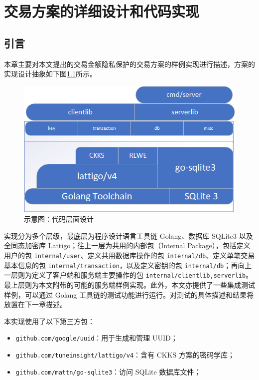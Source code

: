 \chapter{交易方案的详细设计和代码实现}

\section{引言}

本章主要对本文提出的交易金额隐私保护的交易方案的样例实现进行描述，方案的实现设计抽象如下图\ref*{Fig:Design}所示。

\begin{figure}
    \centering
    \includegraphics[width=0.8\linewidth]{Figures/abstract_on_chimata.png}
    \caption{示意图：代码层面设计}\label{Fig:Design}
\end{figure}

实现分为多个层级，最底层为程序设计语言工具链 Golang、数据库 SQLite3 以及全同态加密库 Lattigo；往上一层为共用的内部包（Internal Package），包括定义用户的包 \verb|internal/user|、定义共用数据库操作的包 \verb|internal/db|、定义单笔交易基本信息的包 \verb|internal/transaction|，以及定义密钥的包 \verb|internal/db|；再向上一层则为定义了客户端和服务端主要操作的包 \verb|internal/clientlib,serverlib|。最上层则为本文附带的可能的服务端样例实现。此外，本文亦提供了一些集成测试样例，可以通过 Golang 工具链的测试功能进行运行。对测试的具体描述和结果将放置在下一章描述。

本实现使用了以下第三方包：

\begin{itemize}
    \item \verb|github.com/google/uuid|：用于生成和管理 UUID；
    \item \verb|github.com/tuneinsight/lattigo/v4|：含有 CKKS 方案的密码学库；
    \item \verb|github.com/mattn/go-sqlite3|：访问 SQLite 数据库文件；
\end{itemize}

